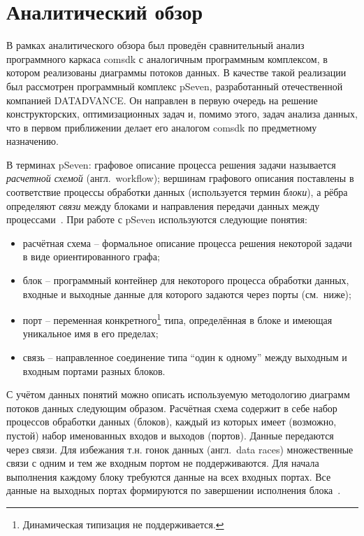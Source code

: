 \chapter{Аналитический обзор}\label{chap2_comp_method}
В рамках аналитического обзора был проведён сравнительный анализ программного каркаса comsdk с аналогичным программным комплексом, в котором реализованы диаграммы потоков данных. В качестве такой реализации был рассмотрен программный комплекс pSeven, разработанный отечественной компанией DATADVANCE. Он направлен в первую очередь на решение конструкторских, оптимизационных задач и, помимо этого, задач анализа данных, что в первом приближении делает его аналогом comsdk по предметному назначению.

В терминах \textsf{pSeven}: графовое описание процесса решения задачи называется \textit{расчетной схемой} (англ.~workflow); вершинам графового описания поставлены в соответствие процессы обработки данных (используется термин \textit{блоки}), а рёбра определяют \textit{связи} между блоками и направления передачи данных между процессами~\cite{NazarenkoDFM2015}. При работе с pSeven используются следующие понятия:
\begin{itemize}
    \item \textsf{расчётная схема} -- формальное описание процесса решения некоторой задачи в виде ориентированного графа;
    \item \textsf{блок} -- программный контейнер для некоторого процесса обработки данных, входные и выходные данные для которого задаются через порты (см.~ниже);
    \item \textsf{порт} -- переменная конкретного\footnote{Динамическая типизация не поддерживается.} типа, определённая в блоке и имеющая уникальное имя в его пределах;
    \item \textsf{связь} -- направленное соединение типа ``один к одному'' между выходным и входным портами разных блоков.
\end{itemize}

С учётом данных понятий можно описать используемую методологию диаграмм потоков данных следующим образом. Расчётная схема содержит в себе набор процессов обработки данных (блоков), каждый из которых имеет (возможно, пустой) набор именованных входов и выходов (портов). Данные передаются через связи. Для избежания т.н. гонок данных (англ.~data races) множественные связи с одним и тем же входным портом не поддерживаются. Для начала выполнения каждому блоку требуются данные на всех входных портах. Все данные на выходных портах формируются по завершении исполнения блока~\cite{NazarenkoDFM2015}.

